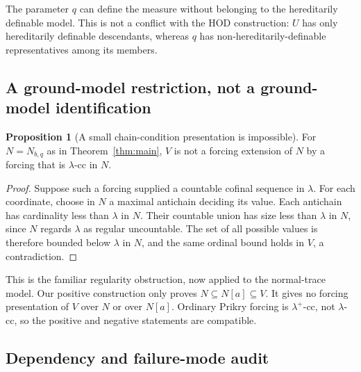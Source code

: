 \documentclass[11pt,letterpaper]{article}
\theoremstyle{definition}
\newtheorem{proposition}[definition]{Proposition}
\numberwithin{equation}{section}
\begin{document}
The parameter $q$ can define the measure without belonging to the
hereditarily definable model. This is not a conflict with the HOD
construction: $U$ has only hereditarily definable descendants, whereas
$q$ has non-hereditarily-definable representatives among its members.

\subsection{A ground-model restriction, not a ground-model identification}

\begin{proposition}[A small chain-condition presentation is impossible]
For $N=N_{b,q}$ as in Theorem~\ref{thm:main}, $V$ is not a forcing
extension of $N$ by a forcing that is $\lambda$-cc in $N$.
\end{proposition}

\begin{proof}
Suppose such a forcing supplied a countable cofinal sequence in
$\lambda$. For each coordinate, choose in $N$ a maximal antichain
deciding its value. Each antichain has cardinality less than $\lambda$
in $N$. Their countable union has size less than $\lambda$ in $N$,
since $N$ regards $\lambda$ as regular uncountable. The set of all
possible values is therefore bounded below $\lambda$ in $N$, and the
same ordinal bound holds in $V$, a contradiction.
\end{proof}

This is the familiar regularity obstruction, now applied to the
normal-trace model. Our positive construction only proves
$N\subseteq N[a]\subseteq V$. It gives no forcing presentation of
$V$ over $N$ or over $N[a]$. Ordinary Prikry forcing is
$\lambda^+$-cc, not $\lambda$-cc, so the positive and negative
statements are compatible.

\subsection{Dependency and failure-mode audit}
\end{document}
